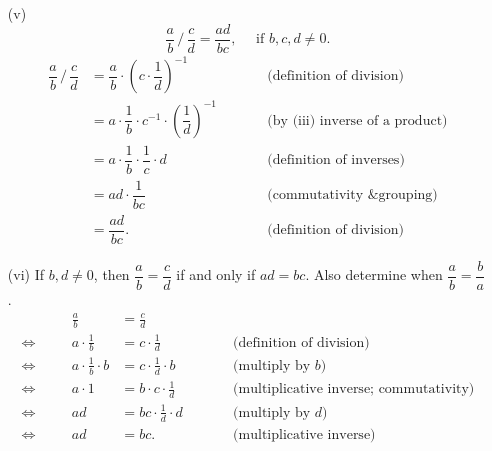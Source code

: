 \documentclass[11pt]{article}
\begin{document}
\begin{enumerate}
    \item[(v)]
          \[
              \dfrac{a}{b} \, \bigg/ \, \dfrac{c}{d} = \dfrac{ad}{bc}, \quad \text{ if } b,c,d \neq 0.
          \]
          \vspace{6pt}
          \[
              \begin{alignedat}{3}
                  \dfrac{a}{b} \, \bigg/ \, \dfrac{c}{d}
                   & = \dfrac{a}{b} \cdot \left(c \cdot \dfrac{1}{d}\right)^{-1}              & \qquad & \text{(definition of division)}        \\
                   & = a \cdot \dfrac{1}{b} \cdot c^{-1} \cdot \left(\dfrac{1}{d}\right)^{-1} &        & \text{(by (iii) inverse of a product)} \\
                   & = a \cdot \dfrac{1}{b} \cdot \dfrac{1}{c} \cdot d                        &        & \text{(definition of inverses)}        \\
                   & = ad \cdot \dfrac{1}{bc}                                                 &        & \text{(commutativity \& grouping)}     \\
                   & = \dfrac{ad}{bc}.                                                        &        & \text{(definition of division)}
              \end{alignedat}
          \]

    \item[(vi)] If $b, d \neq 0$, then $\dfrac{a}{b} = \dfrac{c}{d}$ if and only if $ad = bc$. Also determine when $\dfrac{a}{b} = \dfrac{b}{a}$.
          \[
              \begin{alignedat}{3}
                             &  & \frac{a}{b}                 & = \frac{c}{d}                  & \qquad &                                                \\
                  \iff \quad &  & a \cdot \frac{1}{b}         & = c \cdot \frac{1}{d}          &        & \text{(definition of division)}                \\
                  \iff \quad &  & a \cdot \frac{1}{b} \cdot b & = c \cdot \frac{1}{d} \cdot b  &        & \text{(multiply by $b$)}                       \\
                  \iff \quad &  & a \cdot 1                   & = b \cdot c \cdot \frac{1}{d}  &        & \text{(multiplicative inverse; commutativity)} \\
                  \iff \quad &  & ad                          & = bc \cdot \frac{1}{d} \cdot d &        & \text{(multiply by $d$)}                       \\[4pt]
                  \iff \quad &  & ad                          & = bc.                          &        & \text{(multiplicative inverse)}
              \end{alignedat}
          \]


\end{enumerate}
\end{document}
